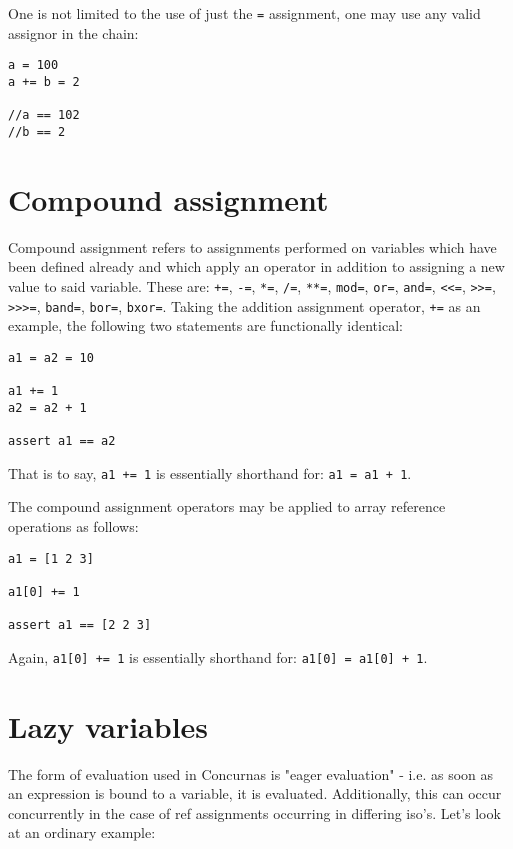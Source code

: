 \documentclass[conc-doc]{subfiles}
\begin{document}
One is not limited to the use of just the \lstinline{=} assignment, one may use any valid assignor in the chain:
\begin{lstlisting}
a = 100
a += b = 2

//a == 102
//b == 2
\end{lstlisting}

\section{Compound assignment}
Compound assignment refers to assignments performed on variables which have been defined already and which apply an operator in addition to assigning a new value to said variable. These are: \lstinline{+=}, \lstinline{-=}, \lstinline{*=}, \lstinline{/=}, \lstinline{**=}, \lstinline{mod=}, \lstinline{or=}, \lstinline{and=}, \lstinline{<<=}, \lstinline{>>=}, \lstinline{>>>=}, \lstinline{band=}, \lstinline{bor=}, \lstinline{bxor=}. Taking the addition assignment operator, \lstinline{+=} as an example, the following two statements are functionally identical:

\begin{lstlisting}
a1 = a2 = 10

a1 += 1
a2 = a2 + 1

assert a1 == a2
\end{lstlisting}

That is to say, \lstinline{a1 += 1} is essentially shorthand for: \lstinline{a1 = a1 + 1}.

The compound assignment operators may be applied to array reference operations as follows:

\begin{lstlisting}
a1 = [1 2 3]

a1[0] += 1

assert a1 == [2 2 3]
\end{lstlisting}

Again, \lstinline{a1[0] += 1} is essentially shorthand for: \lstinline{a1[0] = a1[0] + 1}.

\section{Lazy variables}
The form of evaluation used in Concurnas is "eager evaluation" - i.e. as soon as an expression is bound to a variable, it is evaluated. Additionally, this can occur concurrently in the case of ref assignments occurring in differing iso's. Let's look at an ordinary example:
\end{document}
